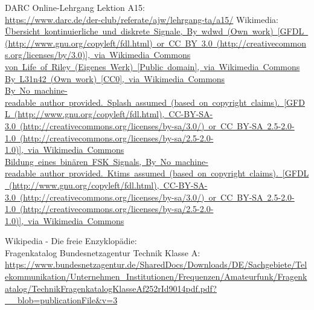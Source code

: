 \begin{thebibliography}{}
    DARC Online-Lehrgang Lektion A15:\\
    \url{https://www.darc.de/der-club/referate/ajw/lehrgang-ta/a15/}
   	Wikimedia:\\
    \href{https://de.wikipedia.org/wiki/Digitalsignal#/media/File:\%C3\%9Cbersicht_kontinuierliche_und_diskrete_Signale.svg}{\mbox{Übersicht kontinuierliche und diskrete Signale, By wdwd (Own work) [GFDL (http://www.gnu.org/copyleft/fdl.html) or CC BY 3.0 (http://creativecommons.org/licenses/by/3.0)], via Wikimedia Commons}}\\
    \href{https://commons.wikimedia.org/wiki/Category:Quantized_QAM?uselang=de#/media/File:Circular_16QAM.svg}{\mbox{von Life of Riley (Eigenes Werk) [Public domain], via Wikimedia Commons}}\\
    \href{https://de.wikipedia.org/wiki/Phasenmodulation#/media/File:Phase_modulation_(PHM).svg}{\mbox{By L31n42 (Own work) [CC0], via Wikimedia Commons}}\\
    \href{https://de.wikipedia.org/wiki/Quadraturphasenumtastung#/media/File:QPSK_Gray_Coded.svg}{\mbox{By No machine-readable author provided. Splash assumed (based on copyright claims). [GFDL (http://www.gnu.org/copyleft/fdl.html), CC-BY-SA-3.0 (http://creativecommons.org/licenses/by-sa/3.0/) or CC BY-SA 2.5-2.0-1.0 (http://creativecommons.org/licenses/by-sa/2.5-2.0-1.0)], via Wikimedia Commons}}\\
    \href{https://de.wikipedia.org/wiki/Frequenzumtastung#/media/File:Fsk.svg}{\mbox{Bildung eines binären FSK Signals, By No machine-readable author provided. Ktims assumed (based on copyright claims). [GFDL (http://www.gnu.org/copyleft/fdl.html), CC-BY-SA-3.0 (http://creativecommons.org/licenses/by-sa/3.0/) or CC BY-SA 2.5-2.0-1.0 (http://creativecommons.org/licenses/by-sa/2.5-2.0-1.0)], via Wikimedia Commons}}

      Wikipedia - Die freie Enzyklopädie:\\
     Fragenkatalog Bundesnetzagentur Technik Klasse A:\\
    \url{https://www.bundesnetzagentur.de/SharedDocs/Downloads/DE/Sachgebiete/Telekommunikation/Unternehmen_Institutionen/Frequenzen/Amateurfunk/Fragenkatalog/TechnikFragenkatalogKlasseAf252rId9014pdf.pdf?__blob=publicationFile&v=3}
\end{thebibliography}


